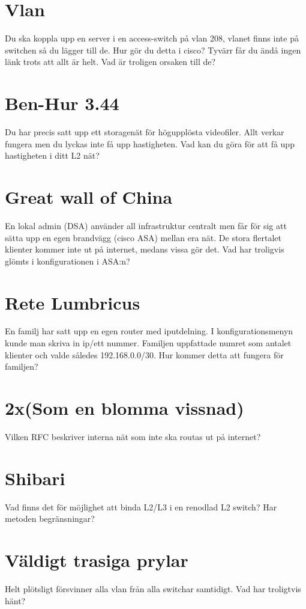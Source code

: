 \documentclass[a4paper]{report}
\begin{document}
\section{Vlan}
Du ska koppla upp en server i en access-switch på vlan 208, vlanet finns inte på switchen så du lägger till de. Hur gör du detta i cisco? 
Tyvärr får du ändå ingen länk trots att allt är helt. Vad är troligen orsaken till de? 

\section{Ben-Hur 3.44}
Du har precis satt upp ett storagenät för högupplösta videofiler. Allt verkar fungera men du lyckas inte få upp hastigheten. Vad kan du göra för att få upp hastigheten i ditt L2 nät?

\section{Great wall of China}
En lokal admin (DSA) använder all infrastruktur centralt men får för sig att sätta upp en egen brandvägg (cisco ASA) mellan era nät. De stora flertalet klienter kommer inte ut på internet, medans vissa gör det. Vad har troligvis glömts i konfigurationen i ASA:n? 

\section{Rete Lumbricus}
En familj har satt upp en egen router med iputdelning. I konfigurationsmenyn kunde man skriva in ip/ett nummer. Familjen uppfattade numret som antalet klienter och valde således 192.168.0.0/30. Hur kommer detta att fungera för familjen?

\section{2x(Som en blomma vissnad)}
Vilken RFC beskriver interna nät som inte ska routas ut på internet? 

\section{Shibari}
Vad finns det för möjlighet att binda L2/L3 i en renodlad L2 switch? Har metoden begränsningar?

\section{Väldigt trasiga prylar}
Helt plötsligt försvinner alla vlan från alla switchar samtidigt. Vad har troligtvis hänt?
\end{document}
